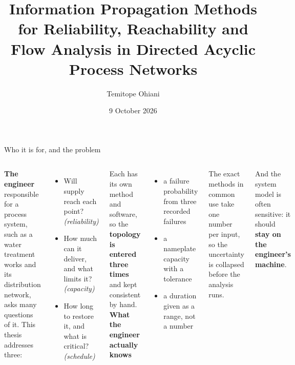 \documentclass[aspectratio=169,11pt]{beamer}
\title{Information Propagation Methods for Reliability, Reachability and Flow Analysis in
Directed Acyclic Process Networks}
\author{Temitope Ohiani}
\institute{Department of Civil and Environmental Engineering\\University of Strathclyde}
\date{9 October 2026}
\newcommand{\bad}[1]{\textcolor{ipared}{#1}}
\begin{document}
\begin{frame}[plain]\titlepage\end{frame}

\begin{frame}{Who it is for, and the problem}
\begin{columns}[T]
\textbf{The engineer} responsible for a process system, such as a water treatment works and
its distribution network, asks many questions of it. This thesis addresses three:
\begin{itemize}
  \item Will supply reach each point? \emph{(reliability)}
  \item How much can it deliver, and what limits it? \emph{(capacity)}
  \item How long to restore it, and what is critical? \emph{(schedule)}
\end{itemize}
\medskip
Each has its own method and software, so the \textbf{topology is entered three times} and
kept consistent by hand.
\textbf{What the engineer actually knows}
\begin{itemize}
  \small
  \item a failure probability from three recorded failures
  \item a nameplate capacity with a tolerance
  \item a duration given as a range, not a number
\end{itemize}
The exact methods in common use take one number per input, so the uncertainty is
\bad{collapsed} before the analysis runs.

\medskip
\small And the system model is often sensitive: it should \textbf{stay on the engineer's
machine}.
\end{columns}
\end{frame}
\end{document}
